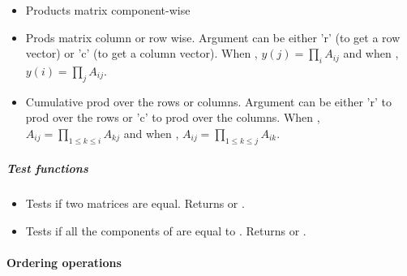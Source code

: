 \begin{itemize}
\item {}
  \sshortdescribe Products matrix component-wise

\item {}
  \sshortdescribe Prods matrix column or row wise. Argument  can be
  either 'r' (to get a row vector) or 'c' (to get a column vector). When
  , $y(j) = \prod_i A_{ij}$ and when , $y(i) = \prod_j
  A_{ij}$.

\item {} 
  \sshortdescribe Cumulative prod over the rows or columns. Argument 
  can be either 'r' to prod over the rows or 'c' to prod over the columns. When
  , $A_{ij} = \prod_{1 \le k \le i} A_{kj}$ and when , 
  $A_{ij} = \prod_{1 \le k \le j} A_{ik}$.
\end{itemize}

\subparagraph{Test functions}

\begin{itemize}
\item {}
  \sshortdescribe Tests if two matrices are equal. Returns  or
  .
\item {}
  \sshortdescribe Tests if all the components of  are equal to
  . Returns  or .
\end{itemize}


\paragraph{Ordering operations}

